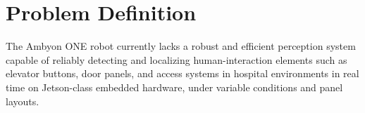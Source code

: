\section{Problem Definition}

The Ambyon ONE robot currently lacks a robust and efficient perception system capable of reliably detecting and localizing human-interaction elements such as elevator buttons, door panels, and access systems in hospital environments in real time on Jetson-class embedded hardware, under variable conditions and panel layouts.
